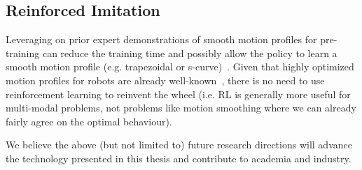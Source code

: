 \subsection{Reinforced Imitation}
Leveraging on prior expert demonstrations of smooth motion profiles for pre-training can reduce the training time and possibly allow the policy to learn a smooth motion profile (e.g. trapezoidal or s-curve)~\cite{pfeiffer_reinforced_2018}. Given that highly optimized motion profiles for robots are already well-known~\cite{meckl_optimized_1998}, there is no need to use reinforcement learning to reinvent the wheel (i.e. RL is generally more useful for multi-modal problems, not problems like motion smoothing where we can already fairly agree on the optimal behaviour).

\vspace{2em}
We believe the above (but not limited to) future research directions will advance the technology presented in this thesis and contribute to academia and industry.
